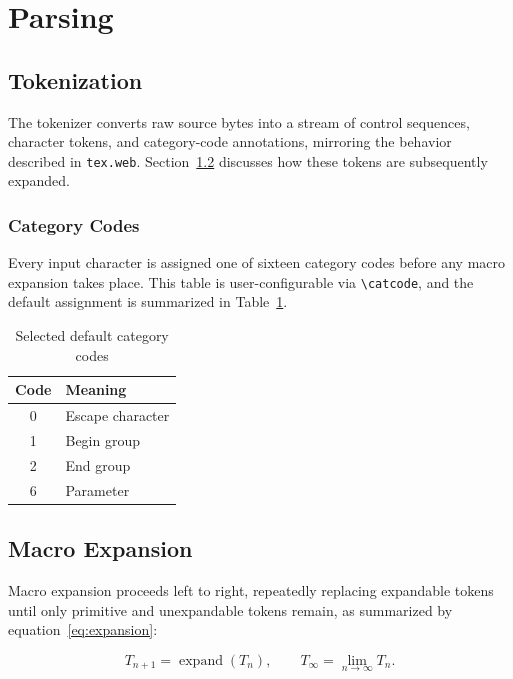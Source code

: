 \documentclass[11pt]{article}
\begin{document}
\section{Parsing}
\label{sec:parsing}

\subsection{Tokenization}
\label{sec:tokenization}

The tokenizer converts raw source bytes into a stream of control sequences,
character tokens, and category-code annotations, mirroring the behavior
described in \texttt{tex.web}. Section~\ref{sec:macro-expansion} discusses
how these tokens are subsequently expanded.

\subsubsection{Category Codes}

Every input character is assigned one of sixteen category codes before any
macro expansion takes place. This table is user-configurable via
\texttt{\textbackslash catcode}, and the default assignment is summarized in
Table~\ref{tab:catcodes}.

\begin{table}[ht]
  \centering
  \begin{tabular}{|c|l|}
    \hline
    Code & Meaning \\
    \hline
    0 & Escape character \\
    1 & Begin group \\
    2 & End group \\
    6 & Parameter \\
    \hline
  \end{tabular}
  \caption{Selected default category codes}
  \label{tab:catcodes}
\end{table}

\subsection{Macro Expansion}
\label{sec:macro-expansion}

Macro expansion proceeds left to right, repeatedly replacing expandable
tokens until only primitive and unexpandable tokens remain, as summarized
by equation~\eqref{eq:expansion}:

\begin{equation}
  \label{eq:expansion}
  T_{n+1} = \operatorname{expand}(T_n), \qquad T_\infty = \lim_{n \to \infty} T_n.
\end{equation}
\end{document}
